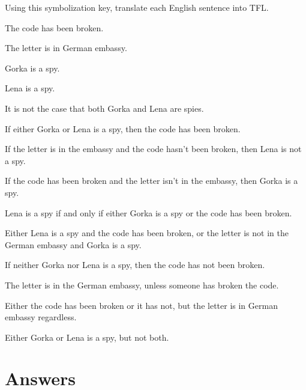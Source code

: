 \problempart
\label{pr.spies}
Using this symbolization key, translate each English sentence into TFL.
\begin{ekey}
\item[C] The code has been broken.
\item[E] The letter is in German embassy.
\item[G] Gorka is a spy.
\item[L] Lena is a spy.
\end{ekey}
\begin{earg}
\item It is not the case that both Gorka and Lena are spies.
\item If either Gorka or Lena is a spy, then the code has been broken.

\item If the letter is in the embassy and the code hasn't been broken, then Lena is not a spy.
\item If the code has been broken and the letter isn't in the embassy, then Gorka is a spy.
\item Lena is a spy if and only if either Gorka is a spy or the code has been broken.
\item Either Lena is a spy and the code has been broken, or the letter is not in the German embassy and Gorka is a spy. 

\item If neither Gorka nor Lena is a spy, then the code has not been broken.
\item The letter is in the German embassy, unless someone has broken the code.
\item Either the code has been broken or it has not, but the letter is in German embassy regardless.
\item Either Gorka or Lena is a spy, but not both.
\end{earg}





\section{Answers}
\setcounter{ProbPart}{0}


